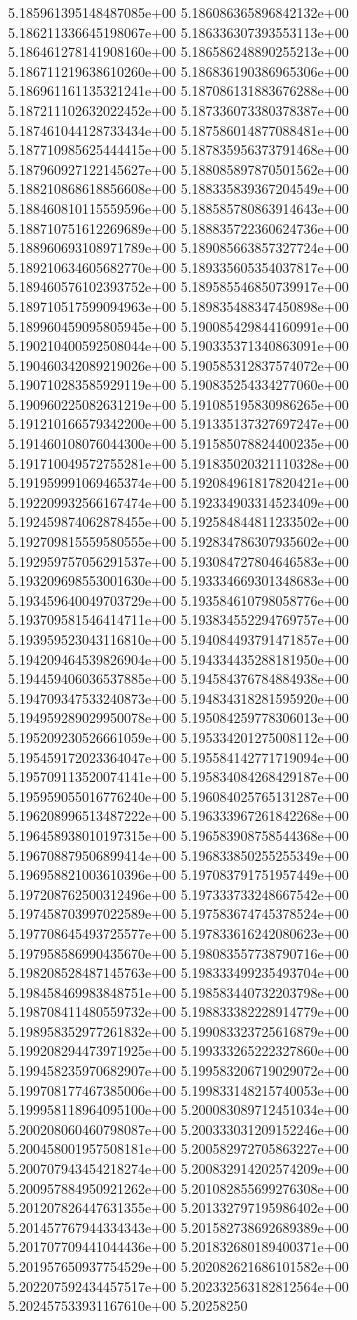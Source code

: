 	5.185961395148487085e+00	5.186086365896842132e+00	5.186211336645198067e+00	5.186336307393553113e+00	5.186461278141908160e+00	5.186586248890255213e+00	5.186711219638610260e+00	5.186836190386965306e+00	5.186961161135321241e+00	5.187086131883676288e+00	5.187211102632022452e+00	5.187336073380378387e+00	5.187461044128733434e+00	5.187586014877088481e+00	5.187710985625444415e+00	5.187835956373791468e+00	5.187960927122145627e+00	5.188085897870501562e+00	5.188210868618856608e+00	5.188335839367204549e+00	5.188460810115559596e+00	5.188585780863914643e+00	5.188710751612269689e+00	5.188835722360624736e+00	5.188960693108971789e+00	5.189085663857327724e+00	5.189210634605682770e+00	5.189335605354037817e+00	5.189460576102393752e+00	5.189585546850739917e+00	5.189710517599094963e+00	5.189835488347450898e+00	5.189960459095805945e+00	5.190085429844160991e+00	5.190210400592508044e+00	5.190335371340863091e+00	5.190460342089219026e+00	5.190585312837574072e+00	5.190710283585929119e+00	5.190835254334277060e+00	5.190960225082631219e+00	5.191085195830986265e+00	5.191210166579342200e+00	5.191335137327697247e+00	5.191460108076044300e+00	5.191585078824400235e+00	5.191710049572755281e+00	5.191835020321110328e+00	5.191959991069465374e+00	5.192084961817820421e+00	5.192209932566167474e+00	5.192334903314523409e+00	5.192459874062878455e+00	5.192584844811233502e+00	5.192709815559580555e+00	5.192834786307935602e+00	5.192959757056291537e+00	5.193084727804646583e+00	5.193209698553001630e+00	5.193334669301348683e+00	5.193459640049703729e+00	5.193584610798058776e+00	5.193709581546414711e+00	5.193834552294769757e+00	5.193959523043116810e+00	5.194084493791471857e+00	5.194209464539826904e+00	5.194334435288181950e+00	5.194459406036537885e+00	5.194584376784884938e+00	5.194709347533240873e+00	5.194834318281595920e+00	5.194959289029950078e+00	5.195084259778306013e+00	5.195209230526661059e+00	5.195334201275008112e+00	5.195459172023364047e+00	5.195584142771719094e+00	5.195709113520074141e+00	5.195834084268429187e+00	5.195959055016776240e+00	5.196084025765131287e+00	5.196208996513487222e+00	5.196333967261842268e+00	5.196458938010197315e+00	5.196583908758544368e+00	5.196708879506899414e+00	5.196833850255255349e+00	5.196958821003610396e+00	5.197083791751957449e+00	5.197208762500312496e+00	5.197333733248667542e+00	5.197458703997022589e+00	5.197583674745378524e+00	5.197708645493725577e+00	5.197833616242080623e+00	5.197958586990435670e+00	5.198083557738790716e+00	5.198208528487145763e+00	5.198333499235493704e+00	5.198458469983848751e+00	5.198583440732203798e+00	5.198708411480559732e+00	5.198833382228914779e+00	5.198958352977261832e+00	5.199083323725616879e+00	5.199208294473971925e+00	5.199333265222327860e+00	5.199458235970682907e+00	5.199583206719029072e+00	5.199708177467385006e+00	5.199833148215740053e+00	5.199958118964095100e+00	5.200083089712451034e+00	5.200208060460798087e+00	5.200333031209152246e+00	5.200458001957508181e+00	5.200582972705863227e+00	5.200707943454218274e+00	5.200832914202574209e+00	5.200957884950921262e+00	5.201082855699276308e+00	5.201207826447631355e+00	5.201332797195986402e+00	5.201457767944334343e+00	5.201582738692689389e+00	5.201707709441044436e+00	5.201832680189400371e+00	5.201957650937754529e+00	5.202082621686101582e+00	5.202207592434457517e+00	5.202332563182812564e+00	5.202457533931167610e+00	5.20258250